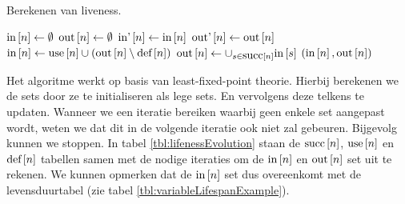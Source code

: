 \begin{algorithm}[hbt]
\caption{Berekenen van liveness.}\label{alg:calculatingLiveness}
\begin{algorithmic}[1]
\State $\mbox{in}\left[n\right]\gets\emptyset$
\State $\mbox{out}\left[n\right]\gets\emptyset$
\EndFor
\Repeat
{}
\State $\mbox{in'}\left[n\right]\gets\mbox{in}\left[n\right]$
\State $\mbox{out'}\left[n\right]\gets\mbox{out}\left[n\right]$
\State $\mbox{in}\left[n\right]\gets\mbox{use}\left[n\right]\cup\left(\mbox{out}\left[n\right]\setminus\mbox{def}\left[n\right]\right)$
\State $\mbox{out}\left[n\right]\gets\displaystyle\cup_{s\in\mbox{succ}\left[n\right]}\mbox{in}\left[s\right]$
\EndFor
{}
\State \Return $\left(\mbox{in}\left[n\right],\mbox{out}\left[n\right]\right)$
\EndFunction
\end{algorithmic}
\end{algorithm}
Het algoritme werkt op basis van least-fixed-point theorie. Hierbij berekenen we de sets door ze te initialiseren als lege sets. En vervolgens deze telkens te updaten. Wanneer we een iteratie bereiken waarbij geen enkele set aangepast wordt, weten we dat dit in de volgende iteratie ook niet zal gebeuren. Bijgevolg kunnen we stoppen. In tabel \ref{tbl:lifenessEvolution} staan de $\mbox{succ}\left[n\right]$, $\mbox{use}\left[n\right]$ en $\mbox{def}\left[n\right]$ tabellen samen met de nodige iteraties om de $\mbox{in}\left[n\right]$ en $\mbox{out}\left[n\right]$ set uit te rekenen. We kunnen opmerken dat de $\mbox{in}\left[n\right]$ set dus overeenkomt met de levensduurtabel (zie tabel \ref{tbl:variableLifespanExample}).
